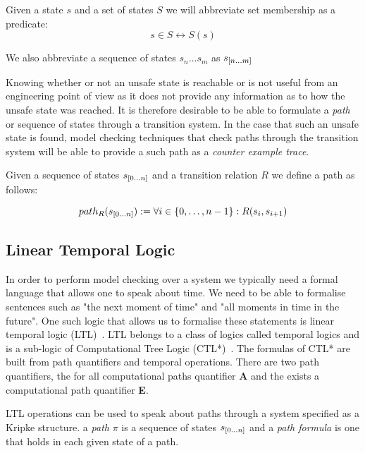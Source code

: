 \begin{myremark}
Given a state $s$ and a set of states $S$ we will abbreviate set membership as a predicate:
 $$s \in S \leftrightarrow S(s)$$

We also  abbreviate  a sequence of states $s_n \ldots s_m$ as $s_{{[}n \ldots m {]}}$

\end{myremark}
\medskip
Knowing whether or not an unsafe state is reachable or is not useful from an engineering point of view as it does not provide any information as to how the unsafe state was reached. It is therefore desirable to be able to formulate a \emph{path} or sequence of states through a transition system. In the case that such an unsafe state is found, model checking techniques that check paths through the transition system will be able to provide a such path as a \emph{counter example trace}.
\medskip
\begin{mydef}[Path]
Given a sequence of states $s_{{[}0 \ldots n {]}}$ and a transition relation $R$ we define a path as follows:
 
$$path_R(s_{{[}0 \ldots n {]}})  := \forall i \in \{0, \ldots, n-1 \} : R(s_i, s_{i+1})$$

\end{mydef}
\medskip
\subsection*{Linear Temporal Logic}

In order to perform model checking over a system we typically need a formal language that allows one to speak about time. We need to be able to formalise sentences such as "the next moment of time" and "all moments in time in the future". One such logic that allows us to formalise these statements is linear temporal logic (LTL)~\cite{AP77}.  LTL belongs to a class of logics called temporal logics and is a sub-logic of Computational Tree Logic (CTL*)~\cite{EE86}. The formulas of CTL* are built from path quantifiers and temporal operations. There are two path quantifiers, the for all computational paths quantifier \textbf{A} and the exists a computational path quantifier \textbf{E}. 

LTL operations can be used to speak about paths through a system specified as a Kripke structure.
a \emph{path} $\pi$ is a sequence of states $s_{{[}0 \ldots n {]}}$ and a \emph{path formula} is one that holds in each given state of a path. 

